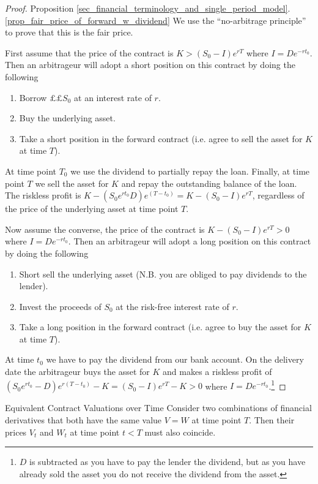 \documentclass[11pt,a4paper]{article}
\begin{document}
  \begin{proof}{Proposition \ref{sec_financial_terminology_and_single_period_model}.\ref{prop_fair_price_of_forward_w_dividend}}
    We use the ``no-arbitrage principle'' to prove that this is the fair price.
    \par First assume that the price of the contract is $K>(S_0-I)e^{rT}$ where $I=De^{-rt_0}$. Then an arbitrageur will adopt a short position on this contract by doing the following
    \begin{enumerate}
      \item Borrow $\pounds£S_0$ at an interest rate of $r$.
      \item Buy the underlying asset.
      \item Take a short position in the forward contract (i.e. agree to sell the asset for $K$ at time $T$).
    \end{enumerate}
    At time point $T_0$ we use the dividend to partially repay the loan. Finally, at time point $T$ we sell the asset for $K$ and repay the outstanding balance of the loan. The riskless profit is $K-(S_0e^{rt_0}D)e^{(T-t_0)}=K-(S_0-I)e^{rT}$, regardless of the price of the underlying asset at time point $T$.
    \par Now assume the converse, the price of the contract is $K-(S_0-I)e^{rT}>0$ where $I=De^{-rt_0}$. Then an arbitrageur will adopt a long position on this contract by doing the following
    \begin{enumerate}
      \item Short sell the underlying asset (N.B. you are obliged to pay dividends to the lender).
      \item Invest the proceeds of $S_0$ at the risk-free interest rate of $r$.
      \item Take a long position in the forward contract (i.e. agree to buy the asset for $K$ at time $T$).
    \end{enumerate}
    At time $t_0$ we have to pay the dividend from our bank account. On the delivery date the arbitrageur buys the asset for $K$ and makes a riskless profit of $(S_0e^{rt_0}-D)e^{r(T-t_0)}-K=(S_0-I)e^{rT}-K>0$ where $I=De^{-rt_0}$.\footnote{$D$ is subtracted as you have to pay the lender the dividend, but as you have already sold the asset you do not receive the dividend from the asset.}
  \end{proof}

  \begin{theorem}{Equivalent Contract Valuations over Time}\label{thrm_equivalent_contract_valuations_over_time}
    Consider two combinations of financial derivatives that both have the same value $V=W$ at time point $T$. Then their prices $V_t$ and $W_t$ at time point $t<T$ must also coincide.
  \end{theorem}
\end{document}
